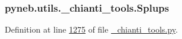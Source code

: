 \subsubsection[{Splups}]{\setlength{\rightskip}{0pt plus 5cm}pyneb.\+utils.\+\_\+chianti\+\_\+tools.\+Splups}\label{namespacepyneb_1_1utils_1_1__chianti__tools_ae4b82a587c953b2207888a96d3364677}


Definition at line \hyperlink{__chianti__tools_8py_source_l01275}{1275} of file \hyperlink{__chianti__tools_8py_source}{\+\_\+chianti\+\_\+tools.\+py}.

